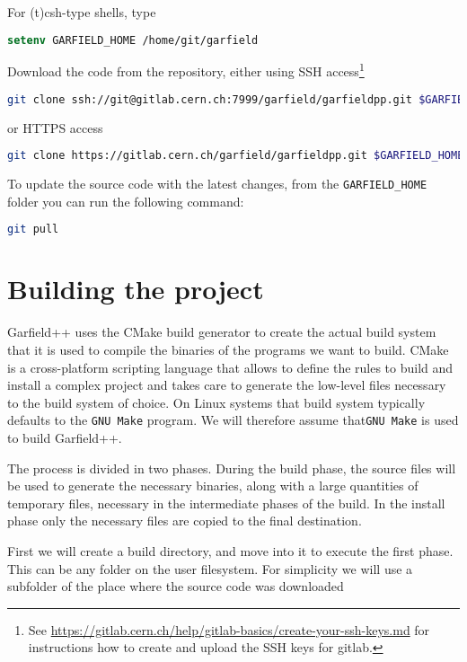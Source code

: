 For (t)csh-type shells, type
\begin{lstlisting}[language=csh]
	setenv GARFIELD_HOME /home/git/garfield
\end{lstlisting}

Download the code from the repository, either 
using SSH access\footnote{See \url{https://gitlab.cern.ch/help/gitlab-basics/create-your-ssh-keys.md}
	for instructions how to create and upload the SSH keys for gitlab.} 
\begin{lstlisting}[language=bash]
git clone ssh://git@gitlab.cern.ch:7999/garfield/garfieldpp.git $GARFIELD_HOME
\end{lstlisting}
or HTTPS access
\begin{lstlisting}[language=bash]
git clone https://gitlab.cern.ch/garfield/garfieldpp.git $GARFIELD_HOME
\end{lstlisting}

To update the source code with the latest changes, from the \texttt{GARFIELD\_HOME} folder you can run the following command:
\begin{lstlisting}[language=bash]
	git pull
\end{lstlisting}

\section{Building the project}

Garfield++ uses the CMake build generator to create the actual build system that it is used to compile the binaries of the programs we want to build. CMake is a cross-platform scripting language that allows to define the rules to build and install a complex project and takes care to generate the low-level files necessary to the build system of choice. On Linux systems that build system typically defaults to the \texttt{GNU Make} program. We will therefore assume that\texttt{GNU Make} is used to build Garfield++.

The process is divided in two phases. During the build phase, the source files will be used to generate the necessary binaries, along with a large quantities of temporary files, necessary in the intermediate phases of the build. In the install phase only the necessary files are copied to the final destination.

First we will create a build directory, and move into it to execute the first phase. This can be any folder on the user filesystem. For simplicity we will use a subfolder of the place where the source code was downloaded

